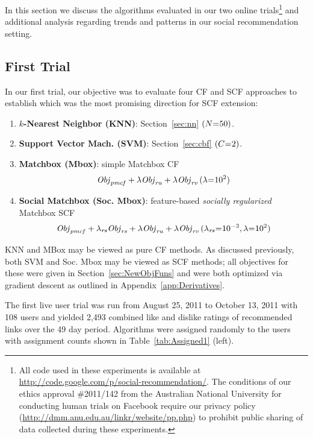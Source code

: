 
In this section we discuss the algorithms evaluated in our two online
trials\footnote{All code used in these experiments is available at
\url{http://code.google.com/p/social-recommendation/}.  The conditions
of our ethics approval \#2011/142 from the Australian National
University for conducting human trials on Facebook require our
privacy policy
(\url{http://dmm.anu.edu.au/linkr/website/pp.php}) to
prohibit public sharing of data collected during these experiments.}
and additional analysis regarding trends and patterns in our social
recommendation setting.

\subsection{First Trial}

In our first trial, our objective was to evaluate four CF and SCF
approaches to establish which was the most promising direction for
SCF extension:
\begin{enumerate}
\item {\bf $k$-Nearest Neighbor (KNN)}: Section~\ref{sec:nn} $(N\hspace{-.9mm}=\hspace{-.9mm}50)$.
\item {\bf Support Vector Mach. \sq(SVM)}: Section~\ref{sec:cbf} $(C\hspace{-.9mm}=\hspace{-.9mm}2)$.
\item {\bf Matchbox (Mbox)}: simple Matchbox CF %
$$\mathit{Obj}_{\mathit{pmcf}} + \lambda \mathit{Obj}_{\mathit{ru}} + \lambda \mathit{Obj}_{\mathit{rv}} \, (\lambda\hspace{-.9mm}=\hspace{-.9mm}10^2)$$
\item {\bf Social Matchbox (Soc. Mbox)}: %
feature-based \emph{socially regularized} Matchbox SCF
$$\mathit{Obj}_{\mathit{pmcf}} + \lambda_{\mathit{rs}} \mathit{Obj}_{\mathit{rs}} + \lambda \mathit{Obj}_{\mathit{ru}} + \lambda \mathit{Obj}_{\mathit{rv}} \, (\lambda_{\mathit{rs}}\hspace{-.9mm}=\hspace{-.9mm}10^{-3}, \lambda\hspace{-.9mm}=\hspace{-.9mm}10^2)$$
\end{enumerate}
KNN and MBox may be viewed as pure CF methods.  As discussed previously,
both SVM and Soc. Mbox may be viewed as SCF methods; all objectives
for these were given in Section~\ref{sec:NewObjFuns}
and were both optimized via gradient descent as outlined
in Appendix~\ref{app:Derivatives}.  

The first live user trial was run from August 25, 2011 to October 13, 2011 
with 108 users and yielded 2,493 combined like and 
dislike ratings of recommended
links over the 49 day period.  Algorithms were assigned randomly to the
users with assignment counts shown in Table~\ref{tab:Assigned1} (left).

